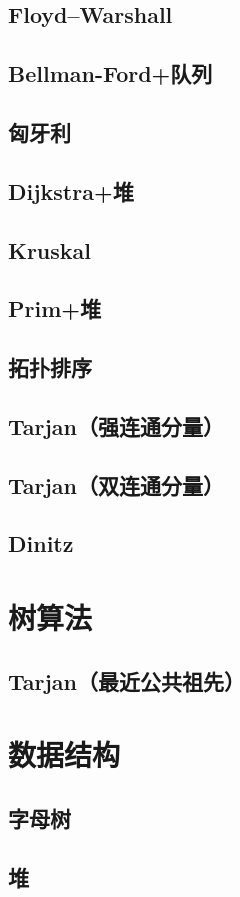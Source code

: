 \documentclass[a4paper]{article}
\begin{document}
\subsection{Floyd–Warshall}
\subsection{Bellman-Ford+队列}
\subsection{匈牙利}
\subsection{Dijkstra+堆}
\subsection{Kruskal}
\subsection{Prim+堆}
\subsection{拓扑排序}
\subsection{Tarjan（强连通分量）}
\subsection{Tarjan（双连通分量）}
\subsection{Dinitz}
\section{树算法}
\subsection{Tarjan（最近公共祖先）}
\section{数据结构}
\subsection{字母树}
\subsection{堆}
\end{document}
